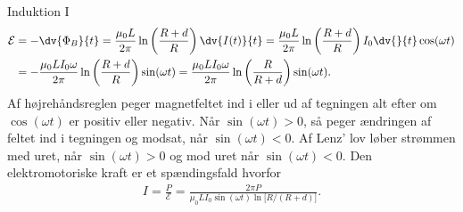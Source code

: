 \begin{opgave}{Induktion I}
    \begin{align*}
        \mathcal{E} &= -\dv{\Phi_B}{t} = \frac{\mu_0L}{2\pi}\ln\left(\frac{R+d}{R}\right)\dv{I(t)}{t} = \frac{\mu_0L}{2\pi}\ln\left(\frac{R+d}{R}\right)I_0\dv{}{t}\cos(\omega t) \\
        &= -\frac{\mu_0LI_0\omega}{2\pi}\ln\left(\frac{R+d}{R}\right)\sin(\omega t) = \frac{\mu_0LI_0\omega}{2\pi}\ln\left(\frac{R}{R+d}\right)\sin(\omega t).
    \end{align*}
    \opg Af højrehåndsreglen peger magnetfeltet ind i eller ud af tegningen alt efter om $\cos(\omega t)$ er positiv eller negativ. Når $\sin(\omega t)>0$, så peger ændringen af feltet ind i tegningen og modsat, når $\sin(\omega t)<0$. Af Lenz' lov løber strømmen med uret, når $\sin(\omega t)>0$ og mod uret når $\sin(\omega t)<0$.
    \opg Den elektromotoriske kraft er et spændingsfald hvorfor
    \begin{align}
        I = \frac{P}{\mathcal{E}} = \frac{2\pi P}{\mu_0LI_0\sin(\omega t)\ln\big[R/(R+d)\big]}.
    \end{align}
\end{opgave}

